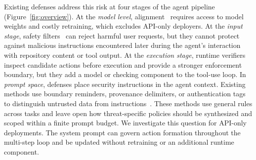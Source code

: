 Existing defenses address this risk at four stages of the agent pipeline (Figure~\ref{fig:overview}). At the \emph{model level}, alignment~\cite{ouyang2022training,bai2022training,rafailov2024dpo} requires access to model weights and costly retraining, which excludes API-only deployers. At the \emph{input stage}, safety filters~\cite{metallamaguard3,metapromptguard2025} can reject harmful user requests, but they cannot protect against malicious instructions encountered later during the agent's interaction with repository content or tool output. At the \emph{execution stage}, runtime verifiers~\cite{luo2025agrail,jia2025task} inspect candidate actions before execution and provide a stronger enforcement boundary, but they add a model or checking component to the tool-use loop. In \emph{prompt space}, defenses place security instructions in the agent context. Existing methods use boundary reminders, provenance delimiters, or authentication tags to distinguish untrusted data from instructions~\cite{yi2025benchmarking,hines2024defending,wang2024fath}. These methods use general rules across tasks and leave open how threat-specific policies should be synthesized and scoped within a finite prompt budget. We investigate this question for API-only deployments. The system prompt can govern action formation throughout the multi-step loop and be updated without retraining or an additional runtime component.


